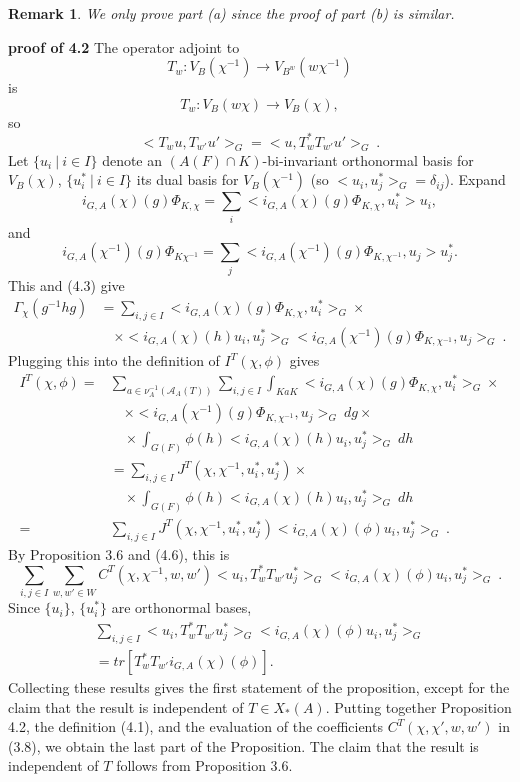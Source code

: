 \documentclass[12pt]{article}
\newtheorem{remark}{Remark}
\newenvironment{pf}[1][proof:]{\par\medskip\noindent\textbf{#1} }{\par\medskip}
\begin{document}
\begin{remark}
We only prove part (a) since the proof of part (b) is similar.
\end{remark}

\begin{pf}[proof of 4.2]
The operator adjoint to
\[
T_w:V_B(\chi^{-1})\rightarrow V_{B^w}(w\chi^{-1})
\]
is
\[
T_w:V_B(w\chi)\rightarrow V_B(\chi),
\]
so
\begin{equation}\tag{4.6}
<T_wu,T_{w'}u'>_G=<u,T^*_wT_{w'}u'>_G\ .
\end{equation}
Let $\{u_i\ |\ i\in I\}$ denote an $(A(F)\cap K)$-bi-invariant orthonormal basis for $V_B(\chi)$, $\{u_i^*\ |\ i\in I\}$ its dual basis for $V_B(\chi^{-1})$ (so $<u_i,u_j^*>_G=\delta_{ij}$). Expand
\[
i_{G,A}(\chi)(g)\Phi_{K,\chi}=\sum_i<i_{G,A}(\chi)(g)\Phi_{K,\chi},u_i^*>u_i,
\]
and
\[
i_{G,A}(\chi^{-1})(g)\Phi_{K\chi^{-1}}=\sum_j<i_{G,A}(\chi^{-1})(g)\Phi_{K,\chi^{-1}},u_j>u_j^*.
\]
This and (4.3) give
\[
\begin{array}{rl}
\Gamma_\chi(g^{-1}hg)&=\sum_{i,j\in I}<i_{G,A}(\chi)(g)\Phi_{K,\chi},u_i^*>_G\times\\
&\quad\times<i_{G,A}(\chi)(h)u_i,u_j^*>_G<i_{G,A}(\chi^{-1})(g)\Phi_{K,\chi^{-1}},u_j>_G\ .
\end{array}
\]
Plugging this into the definition of $I^T(\chi,\phi)$ gives
\begin{equation}\tag{4.7}
\begin{array}{rl}
I^T(\chi,\phi)=&\sum_{a\in\nu_A^{-1}(\mathcal{A}_A(T))}\sum_{i,j\in I}\int_{KaK}<i_{G,A}(\chi)(g)\Phi_{K,\chi},u_i^*>_G\times\\
&\quad\times<i_{G,A}(\chi^{-1})(g)\Phi_{K,\chi^{-1}},u_j>_G\ dg\times\\
&\quad\times\int_{G(F)}\phi(h)<i_{G,A}(\chi)(h)u_i,u_j^*>_G\ dh\\
&=\sum_{i,j\in I}J^T(\chi,\chi^{-1},u_i^*,u_j^*)\times\\
&\quad\times\int_{G(F)}\phi(h)<i_{G,A}(\chi)(h)u_i,u_j^*>_G\ dh\\
=&\sum_{i,j\in I}J^T(\chi,\chi^{-1},u_i^*,u_j^*)<i_{G,A}(\chi)(\phi)u_i,u_j^*>_G\ .
\end{array}
\end{equation}
By Proposition 3.6 and (4.6), this is
\[
\sum_{i,j\in I}\sum_{w,w'\in W}C^T(\chi,\chi^{-1},w,w')<u_i,T^*_wT_{w'}u_j^*>_G<i_{G,A}(\chi)(\phi)u_i,u_j^*>_G\ .
\]
Since $\{u_i\}$, $\{u_i^*\}$ are orthonormal bases,
\[
\begin{array}{rl}
\sum_{i,j\in I}<u_i,T^*_wT_{w'}u_j^*>_G<i_{G,A}(\chi)(\phi)u_i,u_j^*>_G\\
=tr[T^*_wT_{w'}i_{G,A}(\chi)(\phi)].
\end{array}
\]
Collecting these results gives the first statement of the proposition, except for the claim that the result is independent of $T\in X_*(A)$. Putting together Proposition 4.2, the definition (4.1), and the evaluation of the coefficients $C^T(\chi,\chi',w,w')$ in (3.8), we obtain the last part of the Proposition. The claim that the result is independent of $T$ follows from Proposition 3.6.


\end{pf}
\end{document}
